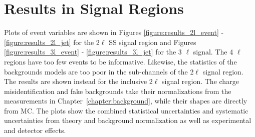 \section{Results in Signal Regions}
Plots of event variables are shown in Figures \ref{figure:results_2l_event} - \ref{figure:results_2l_jet} for the 2$\ell$ SS signal region and Figures \ref{figure:results_3l_event} - \ref{figure:results_3l_jet} for the 3 $\ell$ signal. The 4 $\ell$ regions have too few events to be informative.  Likewise, the statistics of the backgrounds models are too poor in the sub-channels of the  2$\ell$ signal region. The results are shown instead for the inclusive 2$\ell$ signal region. The charge misidentification and fake backgrounds take their normalizations from the measurements in Chapter~\ref{chapter:background}, while their shapes are directly from MC. The plots show the combined statistical uncertainties and systematic uncertainties from theory and background normalization as well as experimental and detector effects. 

